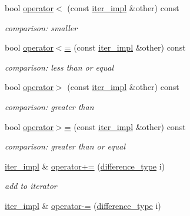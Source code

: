 \begin{DoxyCompactItemize}
bool \hyperlink{classnlohmann_1_1basic__json_1_1iter__impl_ae4b432a44a6471f959fb05d02e14056f}{operator$<$} (const \hyperlink{classnlohmann_1_1basic__json_1_1iter__impl}{iter\+\_\+impl} \&other) const 
\begin{DoxyCompactList}\small\item\em comparison\+: smaller \end{DoxyCompactList}\item 
bool \hyperlink{classnlohmann_1_1basic__json_1_1iter__impl_ab809cefedae1085fb83e68f3d9408d84}{operator$<$=} (const \hyperlink{classnlohmann_1_1basic__json_1_1iter__impl}{iter\+\_\+impl} \&other) const 
\begin{DoxyCompactList}\small\item\em comparison\+: less than or equal \end{DoxyCompactList}\item 
bool \hyperlink{classnlohmann_1_1basic__json_1_1iter__impl_aed1275bd9e5b918398daf5b20c6584a0}{operator$>$} (const \hyperlink{classnlohmann_1_1basic__json_1_1iter__impl}{iter\+\_\+impl} \&other) const 
\begin{DoxyCompactList}\small\item\em comparison\+: greater than \end{DoxyCompactList}\item 
bool \hyperlink{classnlohmann_1_1basic__json_1_1iter__impl_a3b16b57ca5c27303ec791d16ed070c77}{operator$>$=} (const \hyperlink{classnlohmann_1_1basic__json_1_1iter__impl}{iter\+\_\+impl} \&other) const 
\begin{DoxyCompactList}\small\item\em comparison\+: greater than or equal \end{DoxyCompactList}\item 
\hyperlink{classnlohmann_1_1basic__json_1_1iter__impl}{iter\+\_\+impl} \& \hyperlink{classnlohmann_1_1basic__json_1_1iter__impl_a170970e99b7a6d124da0fffa4cb76dba}{operator+=} (\hyperlink{classnlohmann_1_1basic__json_1_1iter__impl_aa3d908ee643e5938d32e5f6d261d7715}{difference\+\_\+type} i)
\begin{DoxyCompactList}\small\item\em add to iterator \end{DoxyCompactList}\item 
\hyperlink{classnlohmann_1_1basic__json_1_1iter__impl}{iter\+\_\+impl} \& \hyperlink{classnlohmann_1_1basic__json_1_1iter__impl_a9fd84e884e8474c000dc966d331a4854}{operator-\/=} (\hyperlink{classnlohmann_1_1basic__json_1_1iter__impl_aa3d908ee643e5938d32e5f6d261d7715}{difference\+\_\+type} i)

\end{DoxyCompactItemize}
